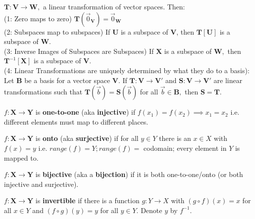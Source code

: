 \documentclass{article}
\begin{document}
\begin{theorem}
$\boldsymbol{T}: \boldsymbol{V} \rightarrow \boldsymbol{W},$ a linear transformation of vector spaces. Then: \\
(1: Zero maps to zero) $\boldsymbol{T}(\vec{0}_{\boldsymbol{V}}) = \vec{0}_{\boldsymbol{W}}$ \\
(2: Subspaces map to subspaces) If $\boldsymbol{U}$ is a subspace of $\boldsymbol{V}$, then $\boldsymbol{T}[\boldsymbol{U}]$ is a subspace of $\boldsymbol{W}.$ \\
(3: Inverse Images of Subspaces are Subspaces) If $\boldsymbol{X}$ is a subspace of $\boldsymbol{W},$ then $\boldsymbol{T}^{-1}[\boldsymbol{X}]$ is a subspace of $\boldsymbol{V}.$ \\
(4: Linear Transformations are uniquely determined by what they do to a basis): Let $\boldsymbol{B}$ be a basis for a vector space $\boldsymbol{V}.$ If $\boldsymbol{T}: \boldsymbol{V} \rightarrow \boldsymbol{V'}$ and $\boldsymbol{S}: \boldsymbol{V} \rightarrow \boldsymbol{V'}$ are linear transformations such that $\boldsymbol{T}(\vec{b}) = \boldsymbol{S}(\vec{b})$ for all $\vec{b} \in \boldsymbol{B},$ then $\boldsymbol{S} = \boldsymbol{T}.$
\end{theorem}

\begin{definition}
$f: \boldsymbol{X} \rightarrow \boldsymbol{Y}$ is \textbf{one-to-one} (aka \textbf{injective}) if $f(x_1) =  f(x_2) \implies x_1 = x_2$ i.e. different elements must map to different places. 
\end{definition}

\begin{definition}
$f: \boldsymbol{X} \rightarrow \boldsymbol{Y}$ is \textbf{onto} (aka \textbf{surjective}) if for all $y \in Y$ there is an $x \in X$ with $f(x) = y$ i.e. $range(f) = Y; range(f)=$ codomain; every element in $Y$ is mapped to.
\end{definition}

\begin{definition}
$f: \boldsymbol{X} \rightarrow \boldsymbol{Y}$ is \textbf{bijective} (aka a \textbf{bijection}) if it is both one-to-one/onto (or both injective and surjective).
\end{definition}

\begin{definition}
$f: \boldsymbol{X} \rightarrow \boldsymbol{Y}$ is \textbf{invertible} if there is a function $g: Y \rightarrow X$ with $(g \circ f)(x) = x$ for all $x \in Y$ and $(f \circ g)(y) = y$ for all $y \in Y.$ Denote $y$ by $f^{-1}.$
\end{definition}
\end{document}
